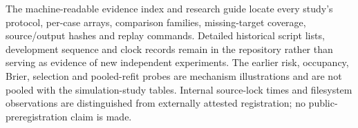 \documentclass[11pt]{article}
\begin{document}
The machine-readable evidence index and research guide locate every study's
protocol, per-case arrays, comparison families, missing-target coverage,
source/output hashes and replay commands. Detailed historical script lists,
development sequence and clock records remain in the repository rather than
serving as evidence of new independent experiments. The earlier risk, occupancy,
Brier, selection and pooled-refit probes are mechanism illustrations and are
not pooled with the simulation-study tables. Internal source-lock times and
filesystem observations are distinguished from externally attested registration;
no public-preregistration claim is made.

\setlength{\bibsep}{3pt plus 1pt minus 1pt}


\end{document}
